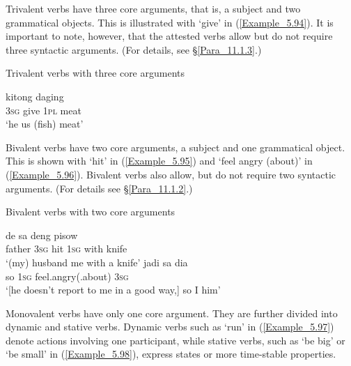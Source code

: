 Trivalent verbs have three core arguments, that is, a subject and two grammatical objects. This is illustrated with  ‘give’ in (\ref{Example_5.94}). It is important to note, however, that the attested  verbs allow but do not require three syntactic arguments. (For details, see §\ref{Para_11.1.3}.)


\begin{styleExampleTitle}
Trivalent verbs with three core arguments
\end{styleExampleTitle}

\ea
\label{Example_5.94}
 {} {kitong} {daging}\\ %
 \textsc{3sg}  give  \textsc{1pl}  meat\\
\glt 
‘he  us (fish) meat’ \textstyleExampleSource{[080919-004-NP.0061]}
\z


Bivalent verbs have two core arguments, a subject and one grammatical object. This is shown with  ‘hit’ in (\ref{Example_5.95}) and  ‘feel angry (about)’ in (\ref{Example_5.96}). Bivalent verbs also allow, but do not require two syntactic arguments. (For details see §\ref{Para_11.1.2}.)


\begin{styleExampleTitle}
Bivalent verbs with two core arguments
\end{styleExampleTitle}

\ea
\label{Example_5.95}
 {de} {} {sa} {deng} {pisow}\\ %
 father  \textsc{3sg}  hit  \textsc{1sg}  with  knife\\
\glt 
‘(my) husband me with a knife’ \textstyleExampleSource{[081011-023-Cv.0167]}
\z
\ea
\label{Example_5.96}
\gll {{\ldots}} {jadi} {sa} {} {dia}\\ %
  { }  so  \textsc{1sg}  feel.angry(.about)  \textsc{3sg}\\
\glt 
‘[he doesn’t report to me in a good way,] so I  him’ \textstyleExampleSource{[081011-020-Cv.0107]}
\z


Monovalent verbs have only one core argument. They are further divided into dynamic and stative verbs. Dynamic verbs such as  ‘run’ in (\ref{Example_5.97}) denote actions involving one participant, while stative verbs, such as  ‘be big’ or  ‘be small’ in (\ref{Example_5.98}), express states or more time-stable properties.


